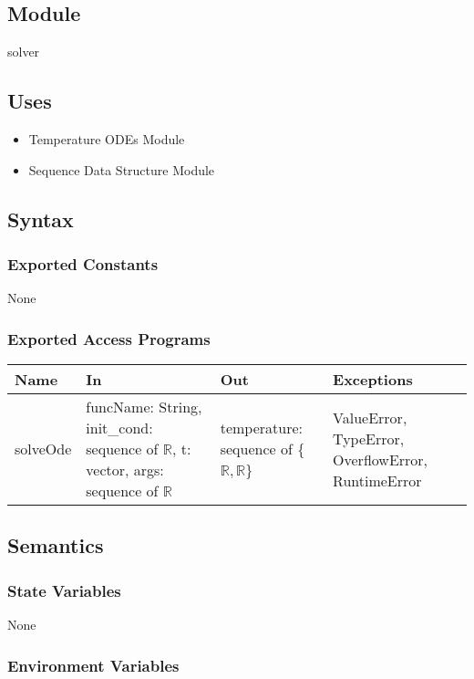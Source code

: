 \documentclass[12pt, titlepage]{article}
\begin{document}
\subsection{Module}

solver

\subsection{Uses}

\begin{itemize}
    \item Temperature ODEs Module
    \item Sequence Data Structure Module
\end{itemize}

\subsection{Syntax}

\subsubsection{Exported Constants}
None 

\subsubsection{Exported Access Programs}

\begin{tabular}{p{1.5cm} p{5.5cm} p{4.5cm} p{3cm}}
\hline
\textbf{Name} & \textbf{In} & \textbf{Out} & \textbf{Exceptions} \\
\hline
solveOde & funcName: String, init\_cond: sequence of $\mathbb{R}$, t: vector, args: sequence of $\mathbb{R}$ & temperature: sequence of \{$\mathbb{R}, \mathbb{R}$\} & ValueError, TypeError, OverflowError, RuntimeError \\
\hline
\end{tabular}

\subsection{Semantics}

\subsubsection{State Variables}

None

\subsubsection{Environment Variables}
\end{document}
